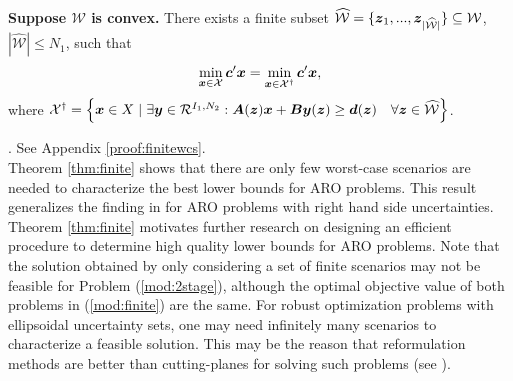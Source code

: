 \documentclass[fleqn,orsc,blindrev]{informs4}
\newcommand{\mb}[1]{\mbox{\boldmath \ensuremath{#1}}}
\begin{document}
 { \begin{theorem} \label{thm:finite}
		\textbf{Suppose $\mathcal{W}$ is convex.} There exists a finite subset $\widehat{\mathcal{W}} =\{\mb{z}_1, ..., \mb{z}_{|\widehat{\mathcal{W}}|}\} \subseteq \mathcal{W}$, $|\widehat{\mathcal{W}}| \le N_1$, such that
\begin{equation} \label{mod:finite}
		\min_{\boldsymbol{x} \in \mathcal{X}} \mb{c}'\mb{x} = \min_{\boldsymbol{x} \in \mathcal{X}^{\dagger}} \mb{c}'\mb{x},
\end{equation}
		where $\mathcal{X}^{\dagger} = \left\{ \mb{x} \in X \hspace{3pt} | \hspace{3pt}  \exists \mb{y} \in \mathcal{R}^{I_1,N_2}: \mb{A}(\mb{z}) \mb{x}+\mb{B}\mb{y}(\mb{z}) \geq\mb{d}(\mb{z})  \quad  \forall \mb{z} \in  \widehat{\mathcal{W}} \right\} $.
	\end{theorem}	
	. See Appendix \ref{proof:finitewcs}. \hfill \Halmos\\
		
	Theorem \ref{thm:finite} shows that there are only few worst-case scenarios are needed to characterize the best lower bounds for ARO problems. This result generalizes the finding in \cite[Theorem 4.4]{hgk11} for ARO problems with right hand side uncertainties. 	Theorem \ref{thm:finite}  motivates further research on designing an efficient procedure to determine high quality lower bounds for ARO problems. Note that the solution obtained by only considering a set of finite scenarios may not be feasible for Problem (\ref{mod:2stage}), although the optimal objective value of both problems in (\ref{mod:finite}) are the same. For robust optimization problems with ellipsoidal uncertainty sets, one may need infinitely many scenarios to characterize a feasible solution. This may be the reason that reformulation methods are better than cutting-planes for solving such problems (see \cite{bdl15}).

}	\fi 
	
	
	
\end{document}
